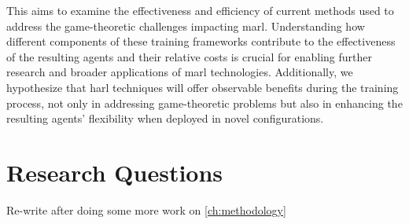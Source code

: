 This \printdoctype aims to examine the effectiveness and efficiency of current methods 
used to address the game-theoretic challenges impacting \gls{marl}. 
Understanding how different components of these training frameworks contribute to the 
effectiveness of the resulting agents and their relative costs is crucial for enabling 
further research and broader applications of \gls{marl} technologies. 
Additionally, we hypothesize that \gls{harl} techniques will offer observable benefits 
during the training process, not only in addressing game-theoretic problems but also in 
enhancing the resulting agents' flexibility when deployed in novel configurations.


\section{Research Questions}%
\label{sec:research_question}%
\label{sec:relevance_and_importance}

\begin{tcolorbox}[colback=red!5,colframe=red!50!black,title=Note to Self]
    Re-write after doing some more work on \cref{ch:methodology}
\end{tcolorbox}

